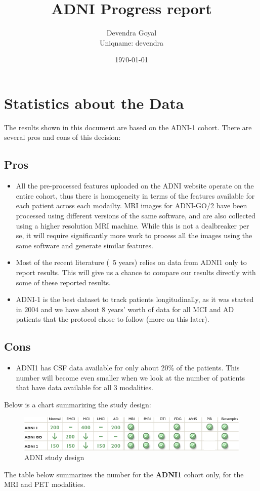\documentclass[12pt,a4paper]{article}
\title{ADNI Progress report}
\author{Devendra Goyal\\Uniqname: devendra}
\date{\today}
\begin{document}
\maketitle

\section{Statistics about the Data}
\label{sec:stats}

The results shown in this document are based on the ADNI-1
cohort. There are several pros and cons of this decision:

\subsection{Pros}

\begin{itemize}
\item All the pre-processed features uploaded on the ADNI website
  operate on the entire cohort, thus there is homogeneity in terms of
  the features available for each patient across each modailty. MRI
  images for ADNI-GO/2 have been processed using different versions of
  the same software, and are also collected using a higher resolution
  MRI machine. While this is not a dealbreaker per se, it will require
  significantly more work to process all the images using the same
  software and generate similar features.
\item Most of the recent literature (~5 years) relies on data from ADNI1
  only to report results. This will give us a chance to compare our
  results directly with some of these reported results.
\item ADNI-1 is the best dataset to track patients longitudinally, as
  it was started in $2004$ and we have about $8$ years' worth of data
  for all MCI and AD patients that the protocol chose to follow (more
  on this later). 
\end{itemize}

\subsection{Cons}

\begin{itemize}
\item ADNI1 has CSF data available for only about 20\% of the
  patients. This number will become even smaller when we look at the
  number of patients that have data available for all 3 modalities.
\end{itemize}

Below is a chart summarizing the study design:

\begin{figure}[ht]
  \centering
  \includegraphics[width=\textwidth]{study-design.png}
  \caption{\label{fig:design}ADNI study design}
\end{figure}

The table below summarizes the number for the \textbf{ADNI1} cohort
only, for the MRI and PET modalities.
\end{document}
